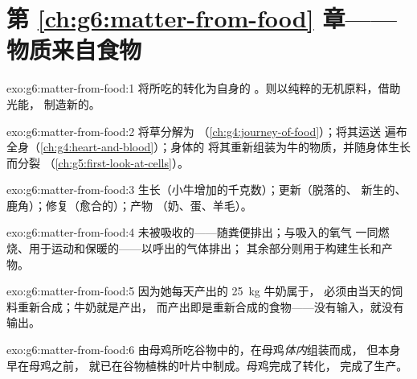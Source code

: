\section*{第 \ref{ch:g6:matter-from-food} 章——物质来自食物}

\begin{solution}{exo:g6:matter-from-food:1}
将所吃的转化为自身的
。则以纯粹的无机原料，借助光能，
制造新的。
\end{solution}

\begin{solution}{exo:g6:matter-from-food:2}
将草分解为
（\cref{ch:g4:journey-of-food}）；将其运送
遍布全身（\cref{ch:g4:heart-and-blood}）；身体的
将其重新组装为牛的物质，并随身体生长而分裂
（\cref{ch:g5:first-look-at-cells}）。
\end{solution}

\begin{solution}{exo:g6:matter-from-food:3}
生长（小牛增加的千克数）；更新（脱落的、
新生的、鹿角）；修复（愈合的）；产物
（奶、蛋、羊毛）。
\end{solution}

\begin{solution}{exo:g6:matter-from-food:4}
未被吸收的——随粪便排出；与吸入的氧气
一同燃烧、用于运动和保暖的——以呼出的气体排出；
其余部分则用于构建生长和产物。
\end{solution}

\begin{solution}{exo:g6:matter-from-food:5}
因为她每天产出的 \qty{25}{kg} 牛奶属于，
必须由当天的饲料重新合成；牛奶就是产出，
而产出即是重新合成的食物——没有输入，就没有输出。
\end{solution}

\begin{solution}{exo:g6:matter-from-food:6}
由母鸡所吃谷物中的，在母鸡\emph{体内}组装而成，
但本身早在母鸡之前，
就已在谷物植株的叶片中制成。母鸡完成了转化，
完成了生产。
\end{solution}

